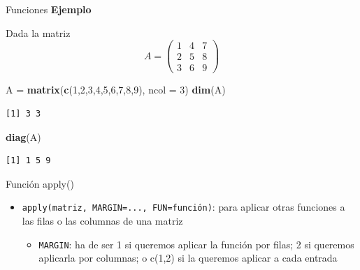 \documentclass[
  ignorenonframetext,
  aspectratio=169]{beamer}
\newenvironment{Shaded}{\begin{snugshade}}{\end{snugshade}}
\newcommand{\AttributeTok}[1]{\textcolor[rgb]{0.13,0.29,0.53}{#1}}
\newcommand{\DecValTok}[1]{\textcolor[rgb]{0.00,0.00,0.81}{#1}}
\newcommand{\FunctionTok}[1]{\textcolor[rgb]{0.13,0.29,0.53}{\textbf{#1}}}
\newcommand{\NormalTok}[1]{#1}
\newcommand{\OtherTok}[1]{\textcolor[rgb]{0.56,0.35,0.01}{#1}}
\providecommand{\tightlist}{%
  \setlength{\itemsep}{0pt}\setlength{\parskip}{0pt}}
\begin{document}
\begin{frame}[fragile]{Funciones}
\label{funciones-6}
\textbf{Ejemplo}

Dada la matriz \[A = \begin{pmatrix}
1 & 4 & 7\\
2 & 5 & 8\\
3 & 6 & 9
\end{pmatrix}\]

\begin{Shaded}
\begin{Highlighting}[]
\NormalTok{A }\OtherTok{=} \FunctionTok{matrix}\NormalTok{(}\FunctionTok{c}\NormalTok{(}\DecValTok{1}\NormalTok{,}\DecValTok{2}\NormalTok{,}\DecValTok{3}\NormalTok{,}\DecValTok{4}\NormalTok{,}\DecValTok{5}\NormalTok{,}\DecValTok{6}\NormalTok{,}\DecValTok{7}\NormalTok{,}\DecValTok{8}\NormalTok{,}\DecValTok{9}\NormalTok{), }\AttributeTok{ncol =} \DecValTok{3}\NormalTok{)}
\FunctionTok{dim}\NormalTok{(A)}
\end{Highlighting}
\end{Shaded}

\begin{verbatim}
[1] 3 3
\end{verbatim}

\begin{Shaded}
\begin{Highlighting}[]
\FunctionTok{diag}\NormalTok{(A)}
\end{Highlighting}
\end{Shaded}

\begin{verbatim}
[1] 1 5 9
\end{verbatim}
\end{frame}

\begin{frame}[fragile]{Función apply()}
\label{funciuxf3n-apply}
\begin{itemize}
\tightlist
\item
  \texttt{apply(matriz,\ MARGIN=...,\ FUN=función)}: para aplicar otras
  funciones a las filas o las columnas de una matriz

  \begin{itemize}
  \tightlist
  \item
    \texttt{MARGIN}: ha de ser 1 si queremos aplicar la función por
    filas; 2 si queremos aplicarla por columnas; o c(1,2) si la queremos
    aplicar a cada entrada
  \end{itemize}
\end{itemize}
\end{frame}
\end{document}
